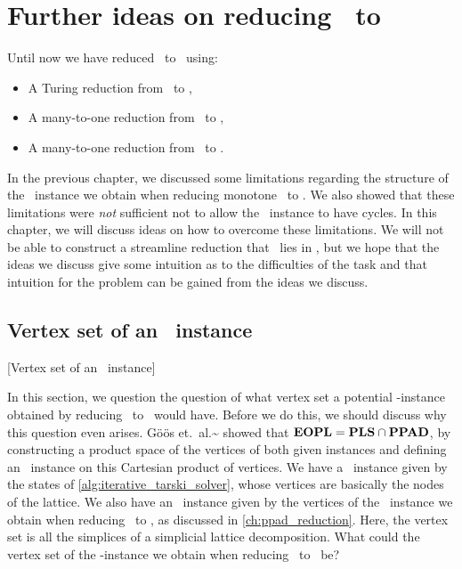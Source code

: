 \setchapterpreamble[u]{\margintoc}
\chapter{Further ideas on reducing \Tarski\ to \EOPL}\label{ch:further_ideas}

Until now we have reduced \Tarski\ to \EndOfLine\ using:
\begin{itemize}
	\item A Turing reduction from \Tarski\ to \Tarskistar,
	\item A many-to-one reduction from \Tarskistar\ to \Sperner,
	\item A many-to-one reduction from \Sperner\ to \EndOfLine.
\end{itemize}
In the previous chapter, we discussed some limitations regarding the structure of the \Sperner\ instance we obtain when reducing monotone \Tarskistar\ to \Sperner. We also showed that these limitations were \emph{not} sufficient not to allow the \EndOfLine\ instance to have cycles. In this chapter, we will discuss ideas on how to overcome these limitations. We will not be able to construct a streamline reduction that \Tarski\ lies in \EOPL, but we hope that the ideas we discuss give some intuition as to the difficulties of the task and that intuition for the problem can be gained from the ideas we discuss.

\section{Vertex set of an \EOPL\ instance}[Vertex set of an \EOPL\ instance]

In this section, we question the question of what vertex set a potential \EOPL-instance obtained by reducing \Tarskistar\ to \EndOfPotentialLine\ would have. Before we do this, we should discuss why this question even arises. Göös et.\ al.\~ showed that $\textbf{EOPL} = \textbf{PLS} \cap \textbf{PPAD}$, by constructing a product space of the vertices of both given instances and defining an \EndOfPotentialLine\ instance on this Cartesian product of vertices. We have a \Localopt\ instance given by the states of \cref{alg:iterative_tarski_solver}, whose vertices are basically the nodes of the lattice. We also have an \EndOfLine\ instance given by the vertices of the \Sperner\ instance we obtain when reducing \Tarskistar\ to \Sperner, as discussed in \cref{ch:ppad_reduction}. Here, the vertex set is all the simplices of a simplicial lattice decomposition. What could the vertex set of the \EndOfPotentialLine-instance we obtain when reducing \Tarskistar\ to \EndOfLine\ be?

